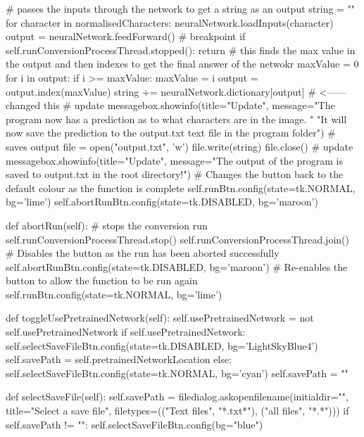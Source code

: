 \documentclass{report}
\begin{document}
\begin{python}
        # passes the inputs through the network to get a string as an output
        string = ""
        for character in normalisedCharacters:
            neuralNetwork.loadInputs(character)
            output = neuralNetwork.feedForward()
            # breakpoint
            if self.runConversionProcessThread.stopped():
                return
            # this finds the max value in the output and then indexes to get the final answer of the netwokr
            maxValue = 0
            for i in output:
                if i >= maxValue:
                    maxValue = i
            output = output.index(maxValue)
            string += neuralNetwork.dictionary[output]  # <------ changed this
        # update
        messagebox.showinfo(title="Update",
                            message="The program now has a prediction as
                            to what characters are in the image. "
                            "It will now save the prediction to the output.txt text file in the program folder")
        # saves output
        file = open("output.txt", 'w')
        file.write(string)
        file.close()
        # update
        messagebox.showinfo(title="Update",
                               message="The output of the program is saved to output.txt in the root directory!")
        # Changes the button back to the default colour as the function is complete
        self.runBtn.config(state=tk.NORMAL, bg='lime')
        self.abortRunBtn.config(state=tk.DISABLED, bg='maroon')

    def abortRun(self):
        # stops the conversion run
        self.runConversionProcessThread.stop()
        self.runConversionProcessThread.join()
        # Disables the button as the run has been aborted successfully
        self.abortRunBtn.config(state=tk.DISABLED, bg='maroon')
        # Re-enables the button to allow the function to be run again
        self.runBtn.config(state=tk.NORMAL, bg='lime')

    def toggleUsePretrainedNetwork(self):
        self.usePretrainedNetwork = not self.usePretrainedNetwork
        if self.usePretrainedNetwork:
            self.selectSaveFileBtn.config(state=tk.DISABLED, bg='LightSkyBlue4')
            self.savePath = self.pretrainedNetworkLocation
        else:
            self.selectSaveFileBtn.config(state=tk.NORMAL, bg='cyan')
            self.savePath = ""

    def selectSaveFile(self):
        self.savePath = filedialog.askopenfilename(initialdir="", title="Select a save file",
                             filetypes=(("Text files", "*.txt*"),
                             ("all files", "*.*")))
        if self.savePath != "":
            self.selectSaveFileBtn.config(bg="blue")


\end{python}
\end{document}

